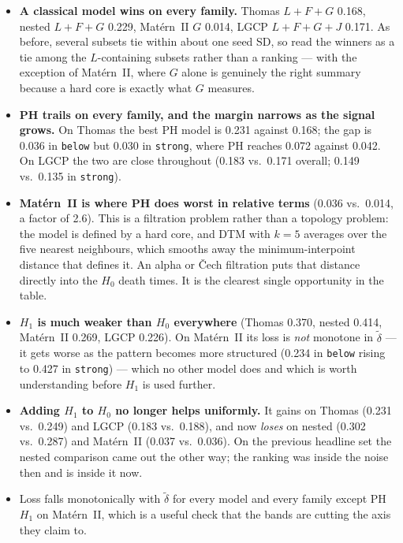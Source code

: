 \documentclass[10pt,a4paper]{article}
\newcommand{\dtil}{\tilde\delta}
\begin{document}


\begin{itemize}
  \item \textbf{A classical model wins on every family.} Thomas $L{+}F{+}G$ 0.168, nested $L{+}F{+}G$ 0.229, Mat\'ern~II $G$ 0.014, LGCP $L{+}F{+}G{+}J$ 0.171. As before, several subsets tie within about one seed SD, so read the winners as a tie among the $L$-containing subsets rather than a ranking --- with the exception of Mat\'ern~II, where $G$ alone is genuinely the right summary because a hard core is exactly what $G$ measures.
  \item \textbf{PH trails on every family, and the margin narrows as the signal grows.} On Thomas the best PH model is 0.231 against 0.168; the gap is 0.036 in \texttt{below} but 0.030 in \texttt{strong}, where PH reaches 0.072 against 0.042. On LGCP the two are close throughout (0.183 vs.\ 0.171 overall; 0.149 vs.\ 0.135 in \texttt{strong}).
  \item \textbf{Mat\'ern~II is where PH does worst in relative terms} (0.036 vs.\ 0.014, a factor of 2.6). This is a filtration problem rather than a topology problem: the model is defined by a hard core, and DTM with $k=5$ averages over the five nearest neighbours, which smooths away the minimum-interpoint distance that defines it. An alpha or \v{C}ech filtration puts that distance directly into the $H_0$ death times. It is the clearest single opportunity in the table.
  \item \textbf{$H_1$ is much weaker than $H_0$ everywhere} (Thomas 0.370, nested 0.414, Mat\'ern~II 0.269, LGCP 0.226). On Mat\'ern~II its loss is \emph{not} monotone in $\dtil$ --- it gets worse as the pattern becomes more structured (0.234 in \texttt{below} rising to 0.427 in \texttt{strong}) --- which no other model does and which is worth understanding before $H_1$ is used further.
  \item \textbf{Adding $H_1$ to $H_0$ no longer helps uniformly.} It gains on Thomas (0.231 vs.\ 0.249) and LGCP (0.183 vs.\ 0.188), and now \emph{loses} on nested (0.302 vs.\ 0.287) and Mat\'ern~II (0.037 vs.\ 0.036). On the previous headline set the nested comparison came out the other way; the ranking was inside the noise then and is inside it now.
  \item Loss falls monotonically with $\dtil$ for every model and every family except PH $H_1$ on Mat\'ern~II, which is a useful check that the bands are cutting the axis they claim to.
\end{itemize}
\end{document}
